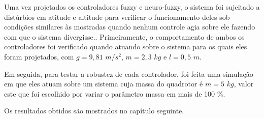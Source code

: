 Uma vez projetados os controladores fuzzy e neuro-fuzzy, o sistema foi sujeitado a distúrbios em atitude e altitude para verificar o funcionamento deles sob condições similares às mostradas quando nenhum controle agia sobre ele fazendo com que o sistema divergisse.. Primeiramente, o comportamento de ambos os controladores foi verificado quando atuando sobre o sistema para os quais eles foram projetados, com $g=9,81$ $m/s^2$, $m=2,3$ $kg$ e $l=0,5$ $m$. 

Em seguida, para testar a robustez de cada controlador, foi feita uma simulação em que eles atuam sobre um sistema cuja massa do quadrotor é $m=5$ $kg$, valor este que foi escolhido por variar o parâmetro massa em mais de 100 \%.

Os resultados obtidos são mostrados no capítulo seguinte.


